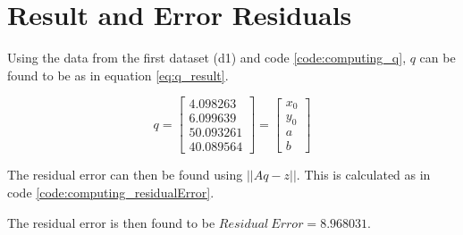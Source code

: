 \section{Result and Error Residuals}

Using the data from the first dataset (d1) and code \ref{code:computing_q}, $q$ can be found to be as in equation \ref{eq:q_result}.



        
        
 

\begin{equation}
q = 
\left[
\begin{array}{c}
4.098263 \\
6.099639 \\
50.093261 \\
40.089564
\end{array}
\right]
= 
\left[
\begin{array}{c}
x_0 \\
y_0 \\
a \\
b
\end{array}
\right]
\label{eq:q_result}
\end{equation}

The residual error can then be found using $|| Aq - z ||$.
This is calculated as in code \ref{code:computing_residualError}.



The residual error is then found to be $ Residual\ Error = 8.968031$.